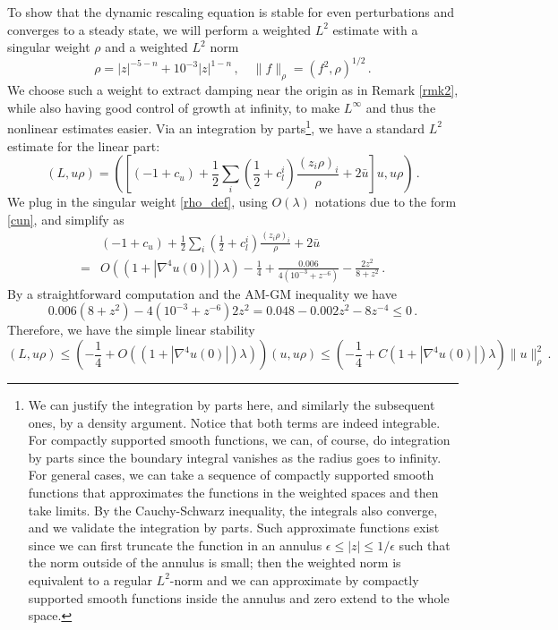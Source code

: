\documentclass[12pt]{caltech_thesis}
\numberwithin{equation}{section}
\begin{document}
To show that the dynamic rescaling equation is stable for even perturbations and converges to a steady state, we will perform a weighted $L^2$ estimate with a singular weight $\rho$ and a weighted $L^2$ norm\begin{equation}
\label{rho_def}\rho=|z|^{-5-n}+10^{-3}|z|^{1-n}\,,\quad \|f\|_{\rho}=(f^2,\rho)^{1/2}\,.
\end{equation}
We choose such a weight to extract damping near the origin as in Remark \ref{rmk2}, while also having good control of growth at infinity, to make $L^{\infty}$ and thus the nonlinear estimates easier.
Via an integration by parts\footnote{We can justify the integration by parts here, and similarly the subsequent ones, by a density argument. Notice that both terms are indeed integrable. For compactly supported smooth functions, we can, of course, do integration by parts since the boundary integral vanishes as the radius goes to infinity. For general cases, we can take a sequence of compactly supported smooth functions that approximates the functions in the weighted spaces and then take limits. By the Cauchy-Schwarz inequality, the integrals also converge, and we validate the integration by parts. Such approximate functions exist since we can first truncate the function in an annulus $\epsilon\leq|z|\leq1/\epsilon$ such that the norm outside of the annulus is small; then the weighted norm is equivalent to a regular $L^2$-norm and we can approximate by compactly supported smooth functions inside the annulus \cite{taylor2006measure} and zero extend to the whole space.}, we have a standard $L^2$ estimate for the linear part:
\begin{equation*}
    (L,u\rho)=([(-1+{c_u})+\frac{1}{2} \sum_i(\frac{1}{2}+{c_l^i})\frac{(z_i\rho)_i}{\rho}+2\bar{u}]u,u\rho)\,.
\end{equation*}
We plug in the singular weight \eqref{rho_def}, using $O(\lambda)$ notations due to the form \eqref{cun}, and simplify as
$$\begin{aligned}
    &(-1+{c_u})+\frac{1}{2} \sum_i(\frac{1}{2}+{c_l^i})\frac{(z_i\rho)_i}{\rho}+2\bar{u}\\=&O((1+|\nabla^4u(0)|)\lambda)-\frac{1}{4}+\frac{0.006}{4 (10^{-3}+z^{-6})}-\frac{2z^2}{8+z^2}\,.
\end{aligned}$$
By a straightforward computation and the AM-GM inequality we have $$0.006(8+z^2)-4 (10^{-3}+z^{-6})2z^2=0.048-0.002z^2-8z^{-4}\leq 0\,.$$
Therefore, we have the simple linear stability
\begin{equation*}
    (L,u\rho)\leq(-\frac{1}{4}+O((1+|\nabla^4u(0)|)\lambda))(u,u\rho)\leq(-\frac{1}{4}+C(1+|\nabla^4u(0)|)\lambda)\|u\|_{\rho}^2\,.
\end{equation*}
\end{document}
